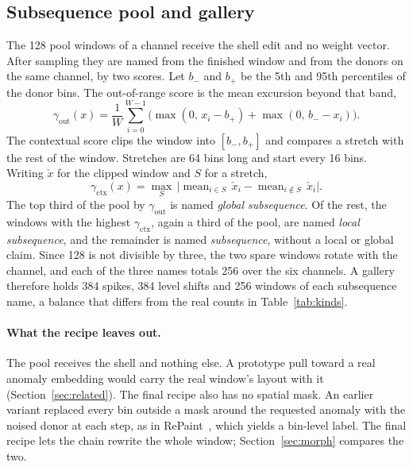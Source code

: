\documentclass[11pt,a4paper]{article}
\newcommand{\gout}{\gamma_{\mathrm{out}}}
\newcommand{\gctx}{\gamma_{\mathrm{ctx}}}
\DeclareMathOperator{\mean}{mean}
\begin{document}
\subsection{Subsequence pool and gallery}
\label{sec:pool}

The 128 pool windows of a channel receive the shell edit and no weight vector.
After sampling they are named from the finished window and from the donors on
the same channel, by two scores. Let $b_{-}$ and $b_{+}$ be the 5th and 95th
percentiles of the donor bins. The out-of-range score is the mean excursion
beyond that band,
\begin{equation}
\label{eq:gout}
\gout(x)
  = \frac{1}{W}\sum_{i=0}^{W-1}
    \bigl(\max(0,\, x_{i} - b_{+}) + \max(0,\, b_{-} - x_{i})\bigr).
\end{equation}
The contextual score clips the window into $[b_{-}, b_{+}]$ and compares a
stretch with the rest of the window. Stretches are 64 bins long and start
every 16 bins. Writing $\check{x}$ for the clipped window and $S$ for a
stretch,
\begin{equation}
\label{eq:gctx}
\gctx(x)
  = \max_{S}\,
    \bigl\lvert
      \mean_{i \in S}\,\check{x}_{i}
      - \mean_{i \notin S}\,\check{x}_{i}
    \bigr\rvert .
\end{equation}
The top third of the pool by $\gout$ is named \emph{global subsequence}. Of
the rest, the windows with the highest $\gctx$, again a third of the pool, are
named \emph{local subsequence}, and the remainder is named \emph{subsequence},
without a local or global claim. Since 128 is not divisible by three, the two
spare windows rotate with the channel, and each of the three names totals 256
over the six channels. A gallery therefore holds 384 spikes, 384 level shifts
and 256 windows of each subsequence name, a balance that differs from the real
counts in Table~\ref{tab:kinds}.

\paragraph{What the recipe leaves out.}
The pool receives the shell and nothing else. A prototype pull toward a real
anomaly embedding would carry the real window's layout with it
(Section~\ref{sec:related}). The final recipe also has no spatial mask. An
earlier variant replaced every bin outside a mask around the requested anomaly
with the noised donor at each step, as in RePaint~\cite{lugmayr2022repaint},
which yields a bin-level label. The final recipe lets the chain rewrite the
whole window; Section~\ref{sec:morph} compares the two.
\end{document}

